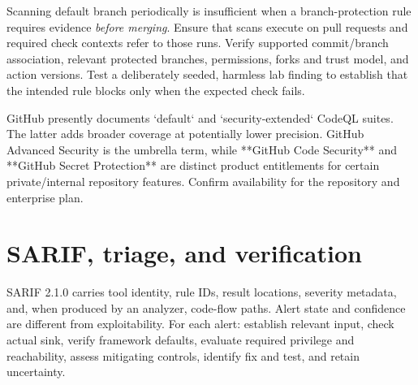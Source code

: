 \documentclass[
  letterpaper,
]{article}
\begin{document}
Scanning default branch periodically is insufficient when a
branch-protection rule requires evidence \emph{before merging}. Ensure
that scans execute on pull requests and required check contexts refer to
those runs. Verify supported commit/branch association, relevant
protected branches, permissions, forks and trust model, and action
versions. Test a deliberately seeded, harmless lab finding to establish
that the intended rule blocks only when the expected check fails.

\begin{modernextension}
GitHub presently documents `default` and `security-extended` CodeQL suites. The latter adds broader coverage at potentially lower precision. GitHub Advanced Security is the umbrella term, while **GitHub Code Security** and **GitHub Secret Protection** are distinct product entitlements for certain private/internal repository features. Confirm availability for the repository and enterprise plan.
\end{modernextension}

\section{SARIF, triage, and
verification}\label{sarif-triage-and-verification}

SARIF 2.1.0 carries tool identity, rule IDs, result locations, severity
metadata, and, when produced by an analyzer, code-flow paths. Alert
state and confidence are different from exploitability. For each alert:
establish relevant input, check actual sink, verify framework defaults,
evaluate required privilege and reachability, assess mitigating
controls, identify fix and test, and retain uncertainty.
\end{document}
